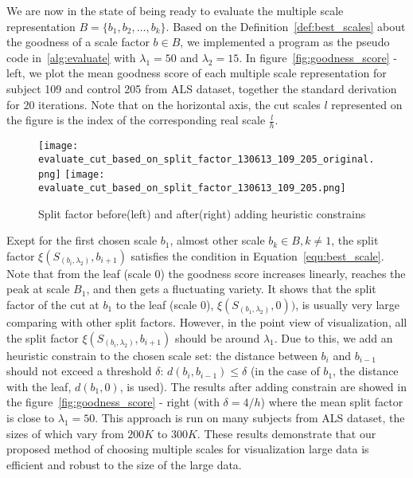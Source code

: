 \vspace{-4mm}We are now in the state of being ready to evaluate the multiple scale representation $\mathsf{\textit{B}} = \{b_1, b_2, \ldots, b_k\}$. Based on the Definition~\ref{def:best_scales} about the goodness of a scale factor $b \in \mathsf{\textit{B}}$, we implemented a program as the pseudo code in~\ref{alg:evaluate} with $\lambda_1 = 50$ and $\lambda_2=15$. In figure~\ref{fig:goodness_score} - left, we plot the mean goodness score of each multiple scale representation for subject 109 and control 205 from ALS dataset, together the standard derivation for $20$ iterations. Note that on the horizontal axis, the cut scales $l$ represented on the figure is the index of the corresponding real scale $\frac{l}{h}$. 
\begin{figure}
  \centering
  \texttt{[image: evaluate\_cut\_based\_on\_split\_factor\_130613\_109\_205\_original.png]}
  \texttt{[image: evaluate\_cut\_based\_on\_split\_factor\_130613\_109\_205.png]}
  \caption{Split factor before(left) and after(right) adding heuristic constrains}
  \label{fig:split_factor}
\end{figure}

\vspace{-0mm}Exept for the first chosen scale $b_1$, almost other scale $b_k \in \mathsf{\textit{B}}, k \neq 1$, the split factor $\xi(S_{(b_i,\lambda_2)},b_{i+1})$ satisfies the condition in Equation~\ref{equ:best_scale}. Note that from the leaf (scale $0$) the goodness score increases linearly, reaches the peak at scale $B_1$, and then gets a fluctuating variety. It shows that the split factor of the cut at $b_1$ to the leaf (scale $0$), $\xi(S_{(b_1,\lambda_2)},0))$, is usually very large comparing with other split factors. However, in the point view of visualization, all the split factor $\xi(S_{(b_i,\lambda_2)},b_{i+1})$ should be around $\lambda_1$. Due to this, 
we add an heuristic constrain to the chosen scale set: the distance between 
$b_i$ and $b_{i-1}$ should not exceed a threshold $\delta$: $d(b_i,b_{i-1}) \leq \delta$ (in the case of $b_1$, the distance with the leaf, $d(b_1,0)$, is used). The results after adding constrain are showed in the figure~\ref{fig:goodness_score} - right (with $\delta = 4/h$) where the mean split factor is close to $\lambda_1 = 50$. This approach is run on many subjects from ALS dataset, the sizes of which vary from $200K$ to $300K$. These results demonstrate that our proposed method of choosing multiple scales for visualization large data is efficient and robust to the size of the large data. 


